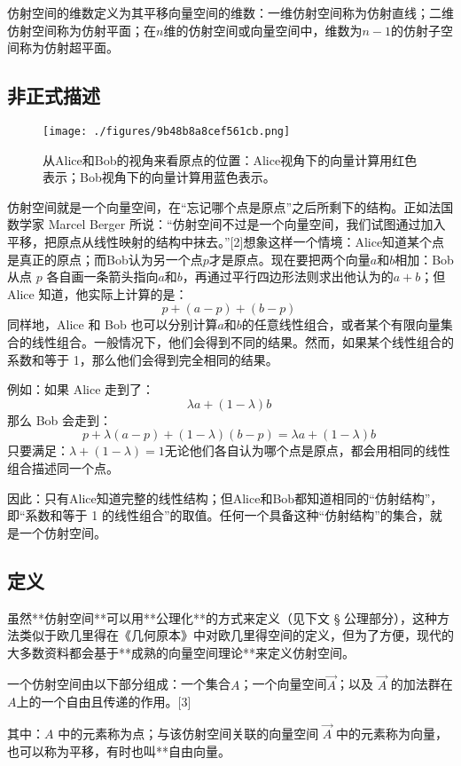 仿射空间的维数定义为其平移向量空间的维数：一维仿射空间称为仿射直线；二维仿射空间称为仿射平面；在$n$维的仿射空间或向量空间中，维数为$n-1$的仿射子空间称为仿射超平面。
\subsection{非正式描述}
\begin{figure}[ht]
\centering
\texttt{[image: ./figures/9b48b8a8cef561cb.png]}
\caption{从Alice和Bob的视角来看原点的位置：Alice视角下的向量计算用红色表示；Bob视角下的向量计算用蓝色表示。} \label{fig_FSKJ_2}
\end{figure}
仿射空间就是一个向量空间，在“忘记哪个点是原点”之后所剩下的结构。正如法国数学家 Marcel Berger 所说：“仿射空间不过是一个向量空间，我们试图通过加入平移，把原点从线性映射的结构中抹去。”[2]想象这样一个情境：Alice知道某个点是真正的原点；而Bob认为另一个点$p$才是原点。现在要把两个向量$a$和$b$相加：Bob 从点 $p$ 各自画一条箭头指向$a$和$b$，再通过平行四边形法则求出他认为的$a + b$；但 Alice 知道，他实际上计算的是：
$$
p + (a - p) + (b - p)~
$$
同样地，Alice 和 Bob 也可以分别计算$a$和$b$的任意线性组合，或者某个有限向量集合的线性组合。一般情况下，他们会得到不同的结果。然而，如果某个线性组合的系数和等于 1，那么他们会得到完全相同的结果。

例如：如果 Alice 走到了：
$$
\lambda a + (1 - \lambda)b~
$$
那么 Bob 会走到：
$$
p + \lambda(a - p) + (1 - \lambda)(b - p) = \lambda a + (1 - \lambda)b~
$$
只要满足：$\lambda + (1 - \lambda) = 1$无论他们各自认为哪个点是原点，都会用相同的线性组合描述同一个点。

因此：只有Alice知道完整的线性结构；但Alice和Bob都知道相同的“仿射结构”，即“系数和等于 1 的线性组合”的取值。任何一个具备这种“仿射结构”的集合，就是一个仿射空间。
\subsection{定义}
虽然**仿射空间**可以用**公理化**的方式来定义（见下文 § 公理部分），这种方法类似于欧几里得在《几何原本》中对欧几里得空间的定义，但为了方便，现代的大多数资料都会基于**成熟的向量空间理论**来定义仿射空间。

一个仿射空间由以下部分组成：一个集合$A$；一个向量空间$\overrightarrow{A}$；以及 $\overrightarrow{A}$ 的加法群在$A$上的一个自由且传递的作用。[3]

其中：$A$ 中的元素称为点；与该仿射空间关联的向量空间 $\overrightarrow{A}$ 中的元素称为向量，也可以称为平移，有时也叫**自由向量。
